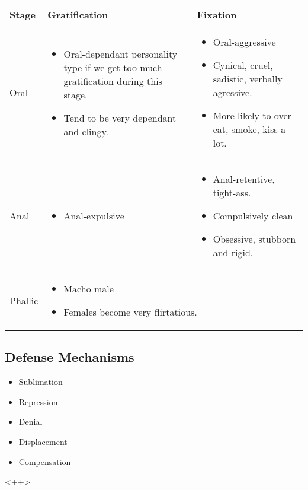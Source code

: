 \documentclass[12pt]{article}
\begin{document}
\begin{table}[h]
	\begin{center}
		\begin{tabular}{|p{}|p{}|p{}|}
			\hline
			Stage &Gratification & Fixation \\
			\hline
			Oral & \begin{itemize}
				\item Oral-dependant personality type if we get too much
					gratification during this stage.
				\item Tend to be very dependant and clingy.
			\end{itemize}
			&
			\begin{itemize}
				\item Oral-aggressive
				\item Cynical, cruel, sadistic, verbally agressive.
				\item More likely to over-eat, smoke, kiss a lot.
			\end{itemize}\\
			\hline
			Anal &
			\begin{itemize}
				\item Anal-expulsive
			\end{itemize}
			&
			\begin{itemize}
				\item Anal-retentive, tight-ass.
				\item Compulsively clean
				\item Obsessive, stubborn and rigid.
			\end{itemize}\\
			\hline
			Phallic &
			\multicolumn{2}{p{0.8\textwidth}|}{
			\begin{itemize}
				\item Macho male
				\item Females become very flirtatious.
			\end{itemize}}\\
			\hline
		\end{tabular}
	\end{center}
\end{table}

\subsection{Defense Mechanisms}

\begin{itemize}
	\item Sublimation
	\item Repression
	\item Denial
	\item Displacement
	\item Compensation
\end{itemize}<++>
\end{document}
